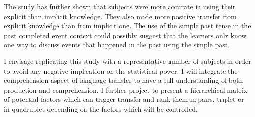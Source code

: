 \documentclass[output=paper,
modfonts
]{langscibook}
\begin{document}
The study has further shown that subjects were more accurate in using their explicit than implicit knowledge. They also made more positive transfer from explicit knowledge than from implicit one. The use of the simple past tense in the past completed event context could possibly suggest that the learners only know one way to discuss events that happened in the past using the simple past.

I envisage replicating this study with a representative number of subjects in order to avoid any negative implication on the statistical power. I will integrate the comprehension aspect of language transfer to have a full understanding of both production and comprehension. I further project to present a hierarchical matrix of potential factors which can trigger transfer and rank them in pairs, triplet or in quadruplet depending on the factors which will be controlled.
 
 
{\sloppy
\printbibliography[heading=subbibliography,notkeyword=this]
}
\end{document}
